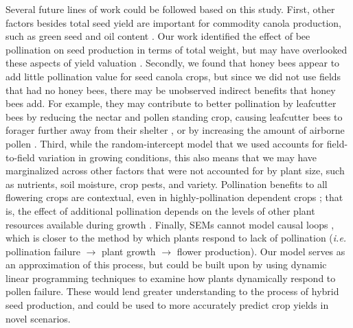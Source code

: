 \documentclass[12pt]{article} %
\begin{document}
Several future lines of work could be followed based on this study.
First, other factors besides total seed yield are important for commodity canola production, such as green seed and oil content \citep{tautorus1994, abbadi2011, ghazani2013}.
Our work identified the effect of bee pollination on seed production in terms of total weight, but may have overlooked these aspects of yield valuation \citep{bommarco2012}. 
Secondly, we found that honey bees appear to add little pollination value for seed canola crops, but since we did not use fields that had no honey bees, there may be unobserved indirect benefits that honey bees add.
For example, they may contribute to better pollination by leafcutter bees by reducing the nectar and pollen standing crop, causing leafcutter bees to forager further away from their shelter \citep{pyke1978b, heinrich1979}, or by increasing the amount of airborne pollen \citep{eisikowitch1981,mesquida1982}.
Third, while the random-intercept model that we used accounts for field-to-field variation in growing conditions, this also means that we may have marginalized across other factors that were not accounted for by plant size, such as nutrients, soil moisture, crop pests, and variety.
Pollination benefits to all flowering crops are contextual, even in highly-pollination dependent crops \citep{tamburini2017, tamburini2019}; that is, the effect of additional pollination depends on the levels of other plant resources available during growth \citep{marini2015, bartomeus2015, gagic2017}.
Finally, SEMs cannot model causal loops \citep{grace2006}, which is closer to the method by which plants respond to lack of pollination (\emph{i.e.} pollination failure $\rightarrow$ plant growth $\rightarrow$ flower production).
Our model serves as an approximation of this process, but could be built upon by using dynamic linear programming techniques \citep{iwasa2000,nord2011} to examine how plants dynamically respond to pollen failure.
These would lend greater understanding to the process of hybrid seed production, and could be used to more accurately predict crop yields in novel scenarios.


\singlespacing




\clearpage %



\end{document}
